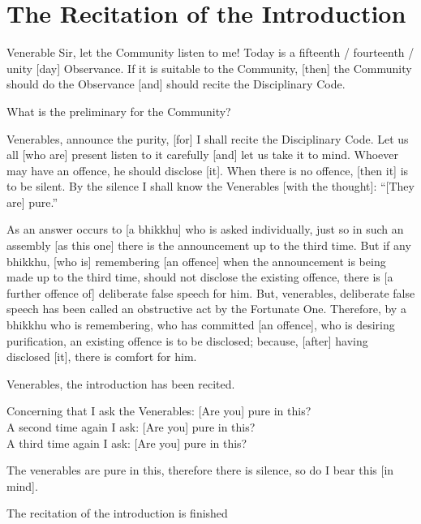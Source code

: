\section{The Recitation of the Introduction}
\label{introduction}

Venerable Sir, let the Community listen to me! Today is a fifteenth / fourteenth / unity [day] Observance. If it is suitable to the Community, [then] the Community should do the Observance [and] should recite the Disciplinary Code.

What is the preliminary for the Community?

Venerables, announce the purity, [for] I shall recite the Disciplinary Code. Let us all [who are] present listen to it carefully [and] let us take it to mind. Whoever may have an offence, he should disclose [it]. When there is no offence, [then it] is to be silent. By the silence I shall know the Venerables [with the thought]: ``[They are] pure.''

As an answer occurs to [a bhikkhu] who is asked individually, just so in such an assembly [as this one] there is the announcement up to the third time. But if any bhikkhu, [who is] remembering [an offence] when the announcement is being made up to the third time, should not disclose the existing offence, there is [a further offence of] deliberate false speech for him. But, venerables, deliberate false speech has been called an obstructive act by the Fortunate One. Therefore, by a bhikkhu who is remembering, who has committed [an offence], who is desiring purification, an existing offence is to be disclosed; because, [after] having disclosed [it], there is comfort for him.

\medskip

\begin{center}
Venerables, the introduction has been recited.

\smallskip

Concerning that I ask the Venerables: [Are you] pure in this?\\
A second time again I ask: [Are you] pure in this?\\
A third time again I ask: [Are you] pure in this?

\smallskip

The venerables are pure in this, therefore there is silence, so do I bear this [in mind].
\end{center}

\begin{outro}
  The recitation of the introduction is finished
\end{outro}

\clearpage
